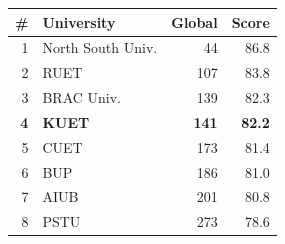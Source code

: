 \begin{tabular}{rlrr}
\toprule
\# & University & Global & Score \\
\midrule
1 & North South Univ. & 44 & 86.8 \\
2 & RUET & 107 & 83.8 \\
3 & BRAC Univ. & 139 & 82.3 \\
\textbf{4} & \textbf{KUET} & \textbf{141} & \textbf{82.2} \\
5 & CUET & 173 & 81.4 \\
6 & BUP & 186 & 81.0 \\
7 & AIUB & 201 & 80.8 \\
8 & PSTU & 273 & 78.6 \\
\bottomrule
\end{tabular}
